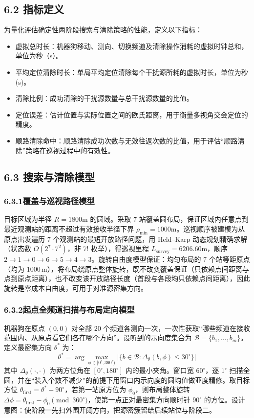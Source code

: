 \documentclass[UTF8, zihao=5,AutoFakeBold=2]{ctexart}
\begin{document}
	\subsection*{6.2 指标定义}

为量化评估确定性两阶段搜索与清除策略的性能，定义以下指标：

\begin{itemize}
    \item 虚拟总时长：机器狗移动、测向、切换频道及清除操作消耗的虚拟时钟总和，单位为秒（s）。
    \item 平均定位清除时长：单局平均定位清除每个干扰源所耗的虚拟时长，单位为秒(s)。
    \item 清除比例：成功清除的干扰源数量与总干扰源数量的比值。
    \item 定位误差：估计位置与实际位置之间的欧氏距离，用于衡量多视角交会定位的精度。
    \item 顺路清除命中：顺路清除成功次数与无效往返次数的比值，用于评估“顺路清除”策略在巡视过程中的有效性。
\end{itemize}

\subsection*{6.3 搜索与清除模型}

\subsubsection*{6.3.1覆盖与巡视路径模型}
目标区域为半径 \(R=1800\text{m}\) 的圆域。采取 7 站覆盖圆布局，保证区域内任意点到最近观测站的距离不超过有效接收半径下界 \(\rho_{\text{min}}=1000\text{m}\)。巡视顺序被建模为从原点出发遍历 7 个观测站的最短开放路径问题，用 Held--Karp 动态规划精确求解（状态数 \(O(2^7\cdot7^2)\)，非 \(7!\) 枚举），得巡视里程 \(L_{\text{survey}}=6206.60\text{m}\)，顺序 \(2\to1\to0\to6\to5\to4\to3\)。旋转自由度模型保证：均匀布局的 7 个站等距原点（均为 1000\,m），将布局绕原点整体旋转，既不改变覆盖保证（只依赖点间距离与点到原点距离），也不改变该开放路径长度（首段与各段均只依赖点间距离），因此旋转是零成本自由度，可用于对准源密集方向。

\subsubsection*{6.3.2起点全频道扫描与布局定向模型}
机器狗在原点 \((0,0)\) 对全部 20 个频道各测向一次，一次性获取“哪些频道在接收范围内、从原点看它们各在哪个方向”。设听到的示向度集合为 \(\mathcal{B} = \{b_1,\dots,b_m\}\)。定义最密集方向 \(\theta^*\) 为：
\begin{equation}
\theta^* = \arg \max_{\phi \in [0^{\circ},360^{\circ})} \left| \{ b \in \mathcal{B} : \Delta_\theta(b, \phi) \leq 30^{\circ} \} \right|
\end{equation}
其中 \(\Delta_\theta(\cdot,\cdot)\) 为两方位角在 \([0^\circ,180^\circ]\) 内的最小夹角。窗口宽 \(60^\circ\)，逐 \(1^\circ\) 扫描全圆，并在“装入个数不减少”的前提下用窗口内示向度的圆均值做亚度精修。取目标方位 \(\theta_{\text{first}} = \theta^* - 90^{\circ}\)，若第一站原方位为 \(\phi_0\)，则布局整体旋转 \(\Delta\phi = \theta_{\text{first}} - \phi_0 \pmod{360^{\circ}}\)，使第一点正对最密集方向顺时针 \(90^{\circ}\) 的方位。设计意图：使阶段一先扫外围开阔方向，把源密簇留给后续站位与阶段二。
\end{document}
